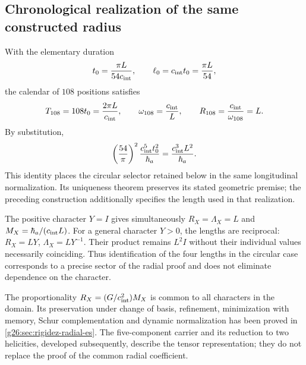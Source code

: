 \subsection{Chronological realization of the same constructed radius}
\label{cr28:sec:radial-clock} With the elementary duration
\begin{equation}
 t_0=\frac{\pi L}{54c_{\rm int}},
 \qquad \ell_0=c_{\rm int}t_0=\frac{\pi L}{54},
 \label{cr28:eq:clock-from-length}
\end{equation}
the calendar of \(108\) positions satisfies
\[
 T_{108}=108t_0=\frac{2\pi L}{c_{\rm int}},\qquad
 \omega_{108}=\frac{c_{\rm int}}{L},\qquad
 R_{108}=\frac{c_{\rm int}}{\omega_{108}}=L.
\]
By substitution,
\begin{equation}
 \left(\frac{54}{\pi}\right)^2
 \frac{c_{\rm int}^5t_0^2}{\hbar_a}
 =\frac{c_{\rm int}^3L^2}{\hbar_a}.
 \label{cr28:eq:circular-radial-agreement}
\end{equation}
This identity places the circular selector retained below in the same longitudinal normalization. Its uniqueness theorem preserves its stated geometric premise; the preceding construction additionally specifies the length used in that realization.

The positive character \(Y=I\) gives simultaneously \(R_X=\Lambda_X=L\) and \(M_X=\hbar_a/(c_{\rm int}L)\). For a general character \(Y>0\), the lengths are reciprocal: \(R_X=LY\), \(\Lambda_X=LY^{-1}\). Their product remains \(L^2I\) without their individual values necessarily coinciding. Thus identification of the four lengths in the circular case corresponds to a precise sector of the radial proof and does not eliminate dependence on the character.

The proportionality \(R_X=(G/c_{\rm int}^{2})M_X\) is common to all characters in the domain. Its preservation under change of basis, refinement, minimization with memory, Schur complementation and dynamic normalization has been proved in \cref{g26:sec:rigidez-radial-es}. The five-component carrier and its reduction to two helicities, developed subsequently, describe the tensor representation; they do not replace the proof of the common radial coefficient.
